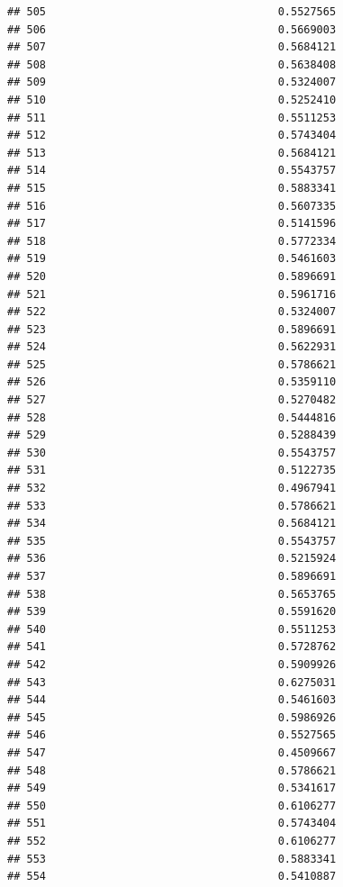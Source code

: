 \documentclass[
  american,
  man,floatsintext]{apa7}
\begin{document}
\begin{verbatim}
## 505                                    0.5527565
## 506                                    0.5669003
## 507                                    0.5684121
## 508                                    0.5638408
## 509                                    0.5324007
## 510                                    0.5252410
## 511                                    0.5511253
## 512                                    0.5743404
## 513                                    0.5684121
## 514                                    0.5543757
## 515                                    0.5883341
## 516                                    0.5607335
## 517                                    0.5141596
## 518                                    0.5772334
## 519                                    0.5461603
## 520                                    0.5896691
## 521                                    0.5961716
## 522                                    0.5324007
## 523                                    0.5896691
## 524                                    0.5622931
## 525                                    0.5786621
## 526                                    0.5359110
## 527                                    0.5270482
## 528                                    0.5444816
## 529                                    0.5288439
## 530                                    0.5543757
## 531                                    0.5122735
## 532                                    0.4967941
## 533                                    0.5786621
## 534                                    0.5684121
## 535                                    0.5543757
## 536                                    0.5215924
## 537                                    0.5896691
## 538                                    0.5653765
## 539                                    0.5591620
## 540                                    0.5511253
## 541                                    0.5728762
## 542                                    0.5909926
## 543                                    0.6275031
## 544                                    0.5461603
## 545                                    0.5986926
## 546                                    0.5527565
## 547                                    0.4509667
## 548                                    0.5786621
## 549                                    0.5341617
## 550                                    0.6106277
## 551                                    0.5743404
## 552                                    0.6106277
## 553                                    0.5883341
## 554                                    0.5410887

\end{verbatim}
\end{document}
